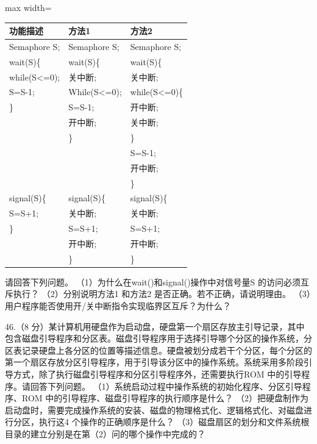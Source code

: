 \documentclass[UTF8,11pt]{ctexart}
\begin{document}
\begin{center}\begin{adjustbox}{max width=\linewidth}\begin{tabular}{|>{\raggedright\arraybackslash}p{\dimexpr(\linewidth-6\tabcolsep-4\arrayrulewidth)/3\relax}|>{\raggedright\arraybackslash}p{\dimexpr(\linewidth-6\tabcolsep-4\arrayrulewidth)/3\relax}|>{\raggedright\arraybackslash}p{\dimexpr(\linewidth-6\tabcolsep-4\arrayrulewidth)/3\relax}|}\hline
功能描述 & 方法1 & 方法2\\\hline
Semaphore S; & Semaphore S; & Semaphore S;\\\hline
wait(S)\{ & wait(S)\{ & wait(S)\{\\\hline
while(S<=0); & 关中断; & 关中断;\\\hline
S=S-1; & While(S<=0); & while(S<=0)\{\\\hline
\} & S=S-1; & 开中断;\\\hline
 & 开中断; & 关中断;\\\hline
 & \} & \}\\\hline
 &  & S=S-1;\\\hline
 &  & 开中断;\\\hline
 &  & \}\\\hline
signal(S)\{ & signal(S)\{ & signal(S)\{\\\hline
S=S+1; & 关中断; & 关中断;\\\hline
\} & S=S+1; & S=S+1;\\\hline
 & 开中断; & 开中断;\\\hline
 & \} & \}\\\hline\end{tabular}\end{adjustbox}\end{center}

请回答下列问题。 （1）为什么在wait()和signal()操作中对信号量S 的访问必须互斥执行？ （2）分别说明方法1 和方法2 是否正确。若不正确，请说明理由。 （3）用户程序能否使用开/关中断指令实现临界区互斥？为什么？


46.（8 分）某计算机用硬盘作为启动盘，硬盘第一个扇区存放主引导记录，其中包含磁盘引导程序和分区表。磁盘引导程序用于选择引导哪个分区的操作系统，分区表记录硬盘上各分区的位置等描述信息。硬盘被划分成若干个分区，每个分区的第一个扇区存放分区引导程序，用于引导该分区中的操作系统。系统采用多阶段引导方式，除了执行磁盘引导程序和分区引导程序外，还需要执行ROM 中的引导程序。请回答下列问题。 （1）系统启动过程中操作系统的初始化程序、分区引导程序、ROM 中的引导程序、磁盘引导程序的执行顺序是什么？ （2）把硬盘制作为启动盘时，需要完成操作系统的安装、磁盘的物理格式化、逻辑格式化、对磁盘进行分区，执行这4 个操作的正确顺序是什么？ （3）磁盘扇区的划分和文件系统根目录的建立分别是在第（2）问的哪个操作中完成的？
\end{document}
